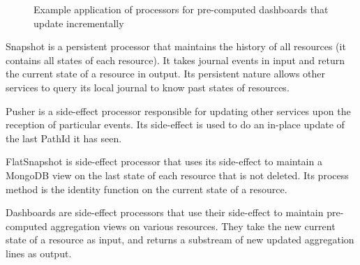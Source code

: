 \begin{figure}[h]
  \begin{center} 
    \caption{Example application of processors for pre-computed dashboards that update incrementally}
    \label{fig:exampleapp}
  \end{center}
\end{figure}

Snapshot is a persistent processor that maintains the history of all resources (it contains all states of each resource). It takes journal events in input and return the current
state of a resource in output. Its persistent nature allows other services to query its local journal to know past states of resources.

Pusher is a side-effect processor responsible for updating other services upon the reception of particular events. Its side-effect is used to do an in-place update of the last PathId
it has seen.

FlatSnapshot is side-effect processor that uses its side-effect to maintain a MongoDB view on the last state of each resource that is not deleted. Its process method is the identity function on the current state of a resource. 

Dashboards are side-effect processors that use their side-effect to maintain pre-computed aggregation views on various resources. They take the new current state of a resource as input,
and returns a substream of new updated aggregation lines as output.




